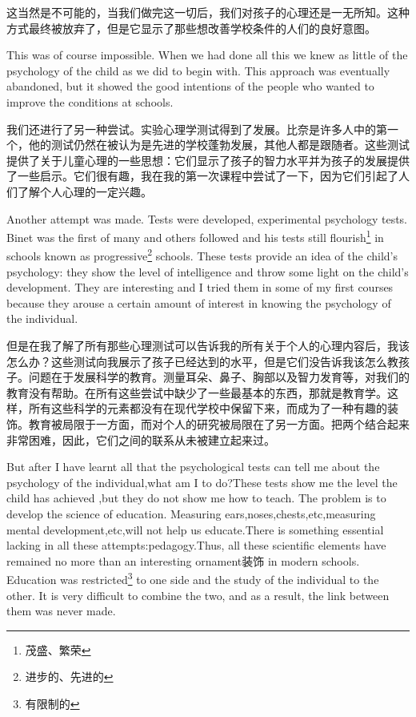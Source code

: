 \documentclass[lang=cn,10pt]{elegantbook}
\begin{document}
这当然是不可能的，当我们做完这一切后，我们对孩子的心理还是一无所知。这种方式最终被放弃了，但是它显示了那些想改善学校条件的人们的良好意图。

This was of course impossible. When we had done all this we knew as little of the psychology of the child as we did to begin with. This approach was eventually abandoned, but it showed the good intentions of the people who wanted to improve the conditions at schools.

我们还进行了另一种尝试。实验心理学测试得到了发展。比奈是许多人中的第一个，他的测试仍然在被认为是先进的学校蓬勃发展，其他人都是跟随者。这些测试提供了关于儿童心理的一些思想：它们显示了孩子的智力水平并为孩子的发展提供了一些启示。它们很有趣，我在我的第一次课程中尝试了一下，因为它们引起了人们了解个人心理的一定兴趣。

Another attempt was made. Tests were developed, experimental psychology tests. Binet was the first of many and others followed and his tests still flourish\footnote{茂盛、繁荣} in schools known as progressive\footnote{进步的、先进的} schools. These tests provide an idea of the child's psychology: they show the level of intelligence and throw some light on the child's development. They are interesting and I tried them in some of my first courses because they arouse a certain amount of interest in knowing the psychology of the individual.

但是在我了解了所有那些心理测试可以告诉我的所有关于个人的心理内容后，我该怎么办？这些测试向我展示了孩子已经达到的水平，但是它们没告诉我该怎么教孩子。问题在于发展科学的教育。测量耳朵、鼻子、胸部以及智力发育等，对我们的教育没有帮助。在所有这些尝试中缺少了一些最基本的东西，那就是教育学。这样，所有这些科学的元素都没有在现代学校中保留下来，而成为了一种有趣的装饰。教育被局限于一方面，而对个人的研究被局限在了另一方面。把两个结合起来非常困难，因此，它们之间的联系从未被建立起来过。

But after I have learnt all that the psychological tests can tell me about the psychology of  the individual,what am I to do?These tests show me the level the child has achieved ,but they do not show me how to teach. The problem is to develop the science of education. Measuring ears,noses,chests,etc,measuring mental development,etc,will not help us educate.There is something essential lacking in all these attempts:pedagogy.Thus, all these scientific elements have remained no more than an interesting ornament装饰 in modern schools. Education was restricted\footnote{有限制的} to one side and the study of the individual to the other. It is very difficult to combine the two, and as a result, the link between them was never made.
\end{document}
